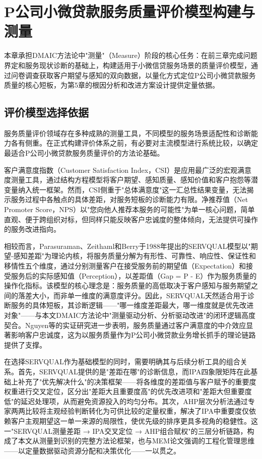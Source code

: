 \chapter{P公司小微贷款服务质量评价模型构建与测量}

本章承担DMAIC方法论中"测量"（Measure）阶段的核心任务：在前三章完成问题界定和服务现状诊断的基础上，构建适用于小微信贷服务场景的质量评价模型，通过问卷调查获取客户期望与感知的双向数据，以量化方式定位P公司小微贷款服务质量的核心短板，为第5章的根因分析和改进方案设计提供定量依据。\par

\section{评价模型选择依据}

服务质量评价领域存在多种成熟的测量工具，不同模型的服务场景适配性和诊断能力各有侧重。在正式构建评价体系之前，有必要对主流模型进行系统比较，以确定最适合P公司小微贷款服务质量评价的方法论基础。\par

客户满意度指数（Customer Satisfaction Index，CSI）是应用最广泛的宏观满意度测量工具，通过结构方程模型将客户期望、感知质量、感知价值和客户抱怨等潜变量纳入统一框架。然而，CSI侧重于"总体满意度"这一汇总性结果变量，无法揭示服务过程中各触点的具体差距，对服务短板的诊断能力有限。净推荐值（Net Promoter Score，NPS）以"您向他人推荐本服务的可能性"为单一核心问题，简单直观、便于跨组织对标，但同样只能反映客户忠诚度的整体倾向，无法提供可操作的服务改进指向。\par

相较而言，Parasuraman、Zeithaml和Berry于1988年提出的SERVQUAL模型以"期望-感知差距"为理论内核，将服务质量分解为有形性、可靠性、响应性、保证性和移情性五个维度，通过分别测量客户在接受服务前的期望值（Expectation）和接受服务后的实际感知值（Perception），以差距值（Gap = P - E）作为服务质量的操作化指标\cite{ref14}。该模型的核心理念是：服务质量的高低取决于客户感知与服务期望之间的落差大小，而非单一维度的满意度评分。因此，SERVQUAL天然适合用于诊断服务的具体短板，其诊断逻辑——"哪一维度差距最大，哪一维度就是优先改进对象"——与本文DMAIC方法论中"测量驱动分析、分析驱动改进"的闭环逻辑高度契合。Nguyen等的实证研究进一步表明，服务质量通过客户满意度的中介效应显著影响客户忠诚度，这为以服务质量作为P公司小微贷款业务增长抓手的理论链路提供了支撑\cite{ref31}。\par

在选择SERVQUAL作为基础模型的同时，需要明确其与后续分析工具的组合关系。首先，SERVQUAL提供的是"差距在哪"的诊断信息，而IPA四象限矩阵在此基础上补充了"优先解决什么"的决策框架——将各维度的差距值与客户赋予的重要度权重进行交叉定位，区分出"差距大且重要度高"的优先改进项和"差距大但重要度低"的延迟处理项，从而避免资源投入的均匀分布。其次，AHP层次分析法通过专家两两比较将主观经验判断转化为可供比较的定量权重，解决了IPA中重要度仅依赖客户主观期望这一单一来源的局限性，使优先级的排序更具多视角的稳健性。这一"SERVQUAL测量差距 → IPA交叉定位 → AHP组合赋权"的三层分析链路，构成了本文从测量到识别的完整方法论框架，也与MEM论文强调的工程化管理思维——以定量数据驱动资源分配和决策优化——一以贯之。\par

